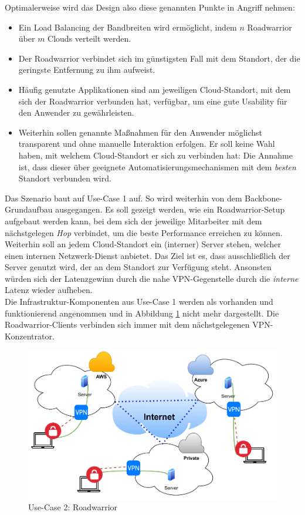 Optimalerweise wird das Design also diese genannten Punkte in Angriff nehmen:
\begin{itemize}
\item Ein Load Balancing der Bandbreiten wird ermöglicht, indem $n$ \gls{Roadwarrior} über $m$ Clouds verteilt werden.
\item Der \gls{Roadwarrior} verbindet sich im günstigsten Fall mit dem Standort, der die geringste Entfernung zu ihm aufweist.
\item Häufig genutzte Applikationen sind am jeweiligen Cloud-Standort, mit dem sich der \gls{Roadwarrior} verbunden hat, verfügbar, um eine gute Usability für den Anwender zu gewährleisten.
\item Weiterhin sollen genannte Maßnahmen für den Anwender möglichst transparent und ohne manuelle Interaktion erfolgen. Er soll keine Wahl haben, mit welchem Cloud-Standort er sich zu verbinden hat: Die Annahme ist, dass dieser über geeignete Automatisierungsmechanismen mit dem \textit{besten} Standort verbunden wird.
\end{itemize}
Das Szenario baut auf Use-Case 1 auf. So wird weiterhin von dem Backbone-Grundaufbau ausgegangen. Es soll gezeigt werden, wie ein \gls{Roadwarrior}-Setup aufgebaut werden kann, bei dem sich der jeweilige Mitarbeiter mit dem nächstgelegen \textit{Hop} verbindet, um die beste Performance erreichen zu können. Weiterhin soll an jedem Cloud-Standort ein (interner) Server stehen, welcher einen internen Netzwerk-Dienst anbietet. Das Ziel ist es, dass ausschließlich der Server genutzt wird, der an dem Standort zur Verfügung steht. Ansonsten würden sich der Latenzgewinn durch die nahe VPN-Gegenstelle durch die \textit{interne} Latenz wieder aufheben.\\
Die Infrastruktur-Komponenten aus Use-Case 1 werden als vorhanden und funktionierend angenommen und in Abbildung \ref{grafik:Use-Case-2_Vereinfacht} nicht mehr dargestellt. Die \gls{Roadwarrior}-\gls{Client}s verbinden sich immer mit dem nächstgelegenen \gls{VPN-Konzentrator}.
\begin{figure}[h]
  \centering
  \includegraphics[scale=0.75]{Figures/Use-Case_2_Vereinfacht_1.pdf}
  \caption{Use-Case 2: Roadwarrior}
  \label{grafik:Use-Case-2_Vereinfacht}
\end{figure}\FloatBarrier

